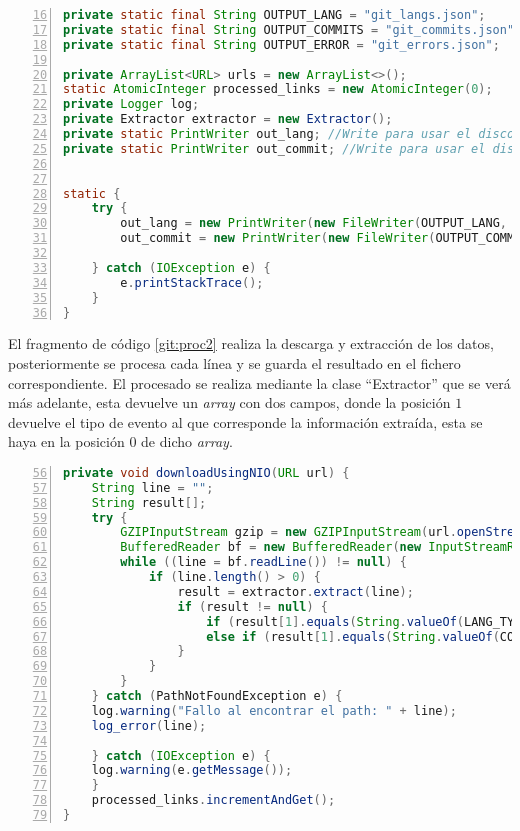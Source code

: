 \begin{lstlisting}[label=git:proc1,language=java,frame=single,caption={Fragmento de la clase \textit{Process}. Declaración de constantes y apertura de ficheros.}, firstnumber=16,numbers=left]
private static final String OUTPUT_LANG = "git_langs.json";         // Fichero de salida con los lenguages
private static final String OUTPUT_COMMITS = "git_commits.json";    // Fichero de salida con los commits
private static final String OUTPUT_ERROR = "git_errors.json";       // Fichero de salida con los errores

private ArrayList<URL> urls = new ArrayList<>();
static AtomicInteger processed_links = new AtomicInteger(0);
private Logger log;
private Extractor extractor = new Extractor();
private static PrintWriter out_lang; //Write para usar el disco
private static PrintWriter out_commit; //Write para usar el disco


static {
	try {
		out_lang = new PrintWriter(new FileWriter(OUTPUT_LANG, true));
		out_commit = new PrintWriter(new FileWriter(OUTPUT_COMMITS, true));
		
	} catch (IOException e) {
		e.printStackTrace();
	}
}
\end{lstlisting}

El fragmento de código \ref{git:proc2} realiza la descarga y extracción de los datos, posteriormente se procesa cada línea y se guarda el resultado en el fichero correspondiente. El procesado se realiza mediante la clase ``Extractor'' que se verá más adelante, esta devuelve un \textit{array} con dos campos, donde la posición $1$ devuelve el tipo de evento al que corresponde la información extraída, esta se haya en la posición $0$ de dicho \textit{array}.

\begin{lstlisting}[label=git:proc2,language=java,frame=single,caption={Fragmento de la clase \textit{Process}. Descarga, extracción y guardado.}, firstnumber=56,numbers=left]
private void downloadUsingNIO(URL url) {
	String line = "";
	String result[];
	try {
		GZIPInputStream gzip = new GZIPInputStream(url.openStream());
		BufferedReader bf = new BufferedReader(new InputStreamReader(gzip, "UTF-8"));
		while ((line = bf.readLine()) != null) {
			if (line.length() > 0) {
				result = extractor.extract(line);
				if (result != null) {
					if (result[1].equals(String.valueOf(LANG_TYPE))) write_lang(result[0]);
					else if (result[1].equals(String.valueOf(COMMIT_TYPE))) write_commit(result[0]);
				}
			}
		}
	} catch (PathNotFoundException e) {
	log.warning("Fallo al encontrar el path: " + line);
	log_error(line);
	
	} catch (IOException e) {
	log.warning(e.getMessage());
	}
	processed_links.incrementAndGet();
}
\end{lstlisting}


